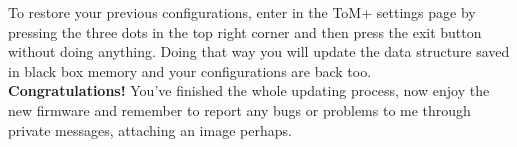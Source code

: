 To restore your previous configurations, enter in the ToM+ settings page by pressing
the three dots in the top right corner and then press the exit button without doing
anything. Doing that way you will update the data structure saved in black box
memory and your configurations are back too.\\

\textbf{Congratulations!} You've finished the whole updating process, now enjoy the new firmware
and remember to report any bugs or problems to me through private messages, attaching 
an image perhaps.